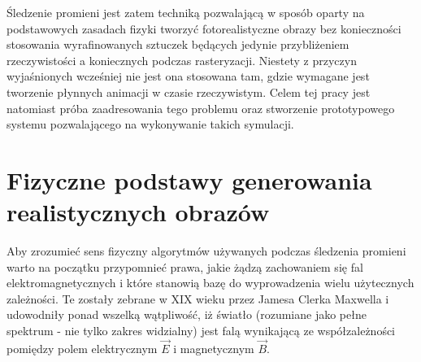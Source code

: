 Śledzenie promieni jest zatem techniką pozwalającą w sposób oparty na podstawowych zasadach fizyki tworzyć fotorealistyczne obrazy bez konieczności stosowania wyrafinowanych sztuczek będących jedynie przybliżeniem rzeczywistości a koniecznych podczas rasteryzacji. Niestety z przyczyn wyjaśnionych wcześniej nie jest ona stosowana tam, gdzie wymagane jest tworzenie płynnych animacji w czasie rzeczywistym. Celem tej pracy jest natomiast próba zaadresowania tego problemu oraz stworzenie prototypowego systemu pozwalającego na wykonywanie takich symulacji. 
\section{Fizyczne podstawy generowania realistycznych obrazów}
Aby zrozumieć sens fizyczny algorytmów używanych podczas śledzenia promieni warto na początku przypomnieć prawa, jakie żądzą zachowaniem się fal elektromagnetycznych i które stanowią bazę do wyprowadzenia wielu użytecznych zależności. Te zostały zebrane w XIX wieku przez Jamesa Clerka Maxwella i udowodniły ponad wszelką wątpliwość, iż światło (rozumiane jako pełne spektrum - nie tylko zakres widzialny) jest falą wynikającą ze współzależności pomiędzy polem elektrycznym $\vec{E}$ i magnetycznym $\vec{B}$. 

